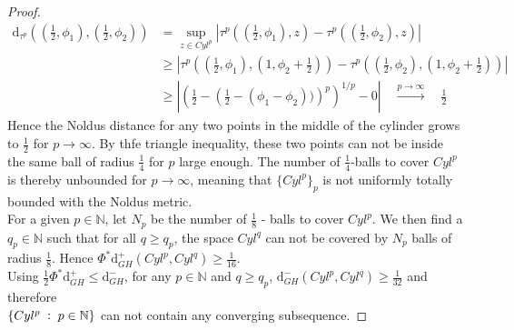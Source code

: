 \documentclass[11pt, a4paper]{article} %
\newcommand{\N}{\mathbb{N}} %
\newcommand{\dd}{\text{d}} %
\theoremstyle{plain} %
\newcommand{\pp}{\; \vcentcolon \;}
\begin{document}
\begin{proof}
\begin{minipage}[t]{0.32\textwidth}
\end{minipage}

\begin{align*}
    \dd_{\tau^p} \left((\frac{1}{2},\phi_1),(\frac{1}{2},\phi_2)\right) &= \sup_{z\in Cyl^p} \left|\tau^p\left((\frac{1}{2},\phi_1),z\right) - \tau^p \left((\frac{1}{2},\phi_2),z\right)\right|\\
    &\geq \left|\tau^p\left((\frac{1}{2},\phi_1),(1,\phi_2+\frac{1}{2})\right) - \tau^p \left((\frac{1}{2},\phi_2),(1,\phi_2+\frac{1}{2})\right)\right| \\
    &\geq \left|  \left( \frac{1}{2} - \left( \frac{1}{2} - (\phi_1 - \phi_2)) \right)^p\right)^{1/p} - 0\right| \quad \overset{p \to \infty}{\longrightarrow} \quad \frac{1}{2}
\end{align*}
Hence the Noldus distance for any two points in the middle of the cylinder grows to $\frac{1}{2}$ for $p\to \infty$. By thfe triangle inequality, these two points can not be inside the same ball of radius $\frac{1}{4}$ for $p$ large enough.
The number of $\frac{1}{4}$-balls to cover $Cyl^p$ is thereby unbounded for $p\to\infty$, meaning that $\{Cyl^p\}_p$ is not uniformly totally bounded with the Noldus metric.\\
For a given $p\in \N$, let $N_p$ be the number of $\frac{1}{8}$ - balls to cover $Cyl^p$. We then find a $q_p\in\N$ such that for all $q\geq q_p$, the space $Cyl^q$ can not be covered by $N_p$ balls of radius $\frac{1}{8}$. Hence
$\Phi^*\dd^+_{GH}(Cyl^p,Cyl^q) \geq \frac{1}{16}$.\\
Using $\frac{1}{2}\Phi^*\dd_{GH}^+ \leq \dd_{GH}^-$, for any $p\in \N$ and $q\geq q_p$, $\dd^-_{GH}(Cyl^p,Cyl^q)\geq \frac{1}{32}$ and therefore\\ $\{Cyl^p \pp p\in \N\}$ can not contain any converging subsequence.
\end{proof}
\end{document}
